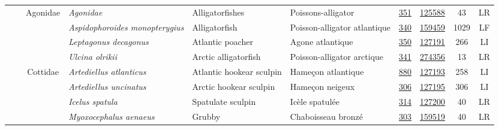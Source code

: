 \documentclass[12pt]{article}\usepackage[]{graphicx}\usepackage[]{color}
\begin{document}
\begin{landscapepage}
\begin{longtable}[t]{ccc>{\centering\arraybackslash}p{3cm}>{\centering\arraybackslash}p{3cm}>{\centering\arraybackslash}p{3cm}>{}c>{}ccc}
\hspace{1em}\hspace{1em} &  & Agonidae & \em{Agonidae} & Alligatorfishes & Poissons-alligator & \href{#sec:351}{351} & \href{http://www.marinespecies.org/aphia.php?p=taxdetails&id=125588}{125588} & 43 & LR\\
\hspace{1em}\hspace{1em} &  &  & \em{Aspidophoroides monopterygius} & Alligatorfish & Poisson-alligator atlantique & \href{#sec:340}{340} & \href{http://www.marinespecies.org/aphia.php?p=taxdetails&id=159459}{159459} & 1029 & LF\\
\hspace{1em}\hspace{1em} &  &  & \em{Leptagonus decagonus} & Atlantic poacher & Agone atlantique & \href{#sec:350}{350} & \href{http://www.marinespecies.org/aphia.php?p=taxdetails&id=127191}{127191} & 266 & LI\\
\hspace{1em}\hspace{1em} &  &  & \em{Ulcina olrikii} & Arctic alligatorfish & Poisson-alligator arctique & \href{#sec:341}{341} & \href{http://www.marinespecies.org/aphia.php?p=taxdetails&id=274356}{274356} & 13 & LR\\
\hspace{1em}\hspace{1em} &  & Cottidae & \em{Artediellus atlanticus} & Atlantic hookear sculpin & Hameçon atlantique & \href{#sec:880}{880} & \href{http://www.marinespecies.org/aphia.php?p=taxdetails&id=127193}{127193} & 258 & LI\\
\hspace{1em}\hspace{1em} &  &  & \em{Artediellus uncinatus} & Arctic hookear sculpin & Hameçon neigeux & \href{#sec:306}{306} & \href{http://www.marinespecies.org/aphia.php?p=taxdetails&id=127195}{127195} & 306 & LI\\
\hspace{1em}\hspace{1em} &  &  & \em{Icelus spatula} & Spatulate sculpin & Icèle spatulée & \href{#sec:314}{314} & \href{http://www.marinespecies.org/aphia.php?p=taxdetails&id=127200}{127200} & 40 & LR\\
\hspace{1em}\hspace{1em} &  &  & \em{Myoxocephalus aenaeus} & Grubby & Chaboisseau bronzé & \href{#sec:303}{303} & \href{http://www.marinespecies.org/aphia.php?p=taxdetails&id=159519}{159519} & 40 & LR\\

\end{longtable}
\end{landscapepage}
\end{document}
